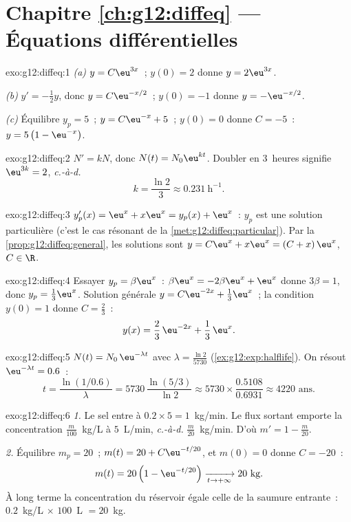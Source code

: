 \section*{Chapitre \ref{ch:g12:diffeq} --- Équations différentielles}

\begin{solution}{exo:g12:diffeq:1}
\emph{(a)} $y = C\eu^{3x}$~; $y(0) = 2$ donne $y = 2\eu^{3x}$.

\emph{(b)} $y' = -\frac12 y$, donc $y = C\eu^{-x/2}$~; $y(0) = -1$ donne
$y = -\eu^{-x/2}$.

\emph{(c)} Équilibre $y_p = 5$~; $y = C\eu^{-x} + 5$~; $y(0) = 0$ donne
$C = -5$~: $y = 5\left(1 - \eu^{-x}\right)$.
\end{solution}

\begin{solution}{exo:g12:diffeq:2}
$N' = kN$, donc $N(t) = N_0 \eu^{kt}$. Doubler en $3$~heures signifie
$\eu^{3k} = 2$, \emph{c.-à-d.}
\[
k = \frac{\ln 2}{3} \approx 0.231\ \text{h}^{-1}.
\]
\end{solution}

\begin{solution}{exo:g12:diffeq:3}
$y_p'(x) = \eu^x + x\eu^x = y_p(x) + \eu^x$~: $y_p$ est une solution
particulière (c'est le cas résonant de la
\cref{met:g12:diffeq:particular}). Par la \cref{prop:g12:diffeq:general},
les solutions sont $y = C\eu^{x} + x\eu^{x} = (C + x)\,\eu^x$,
$C \in \R$.
\end{solution}

\begin{solution}{exo:g12:diffeq:4}
Essayer $y_p = \beta\eu^x$~: $\beta\eu^x = -2\beta\eu^x + \eu^x$ donne
$3\beta = 1$, donc $y_p = \frac13\eu^x$. Solution générale
$y = C\eu^{-2x} + \frac13\eu^{x}$~; la condition $y(0) = 1$ donne
$C = \frac23$~:
\[
y(x) = \frac{2}{3}\,\eu^{-2x} + \frac{1}{3}\,\eu^{x}.
\]
\end{solution}

\begin{solution}{exo:g12:diffeq:5}
$N(t) = N_0\,\eu^{-\lambda t}$ avec $\lambda = \frac{\ln 2}{5730}$
(\cref{ex:g12:exp:halflife}). On résout $\eu^{-\lambda t} = 0.6$~:
\[
t = \frac{\ln(1/0.6)}{\lambda} = 5730\,\frac{\ln(5/3)}{\ln 2}
\approx 5730 \times \frac{0.5108}{0.6931} \approx 4220 \text{ ans}.
\]
\end{solution}

\begin{solution}{exo:g12:diffeq:6}
\emph{1.} Le sel entre à $0.2 \times 5 = 1$~kg/min. Le flux sortant emporte
la concentration $\frac{m}{100}$~kg/L à $5$~L/min, \emph{c.-à-d.}
$\frac{m}{20}$~kg/min. D'où $m' = 1 - \frac{m}{20}$.

\emph{2.} Équilibre $m_p = 20$~; $m(t) = 20 + C\eu^{-t/20}$, et
$m(0) = 0$ donne $C = -20$~:
\[
m(t) = 20\left(1 - \eu^{-t/20}\right) \xrightarrow[t\to+\infty]{} 20 \text{ kg}.
\]
À long terme la concentration du réservoir égale celle de la saumure
entrante~: $0.2$~kg/L $\times$ $100$~L $= 20$~kg.
\end{solution}

